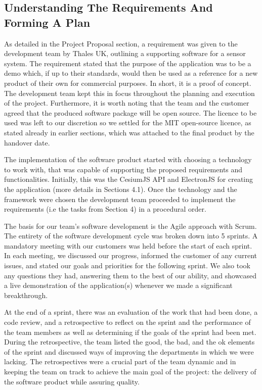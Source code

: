 \documentclass{l3proj}
\begin{document}
\subsection{Understanding The Requirements And Forming A Plan}

As detailed in the Project Proposal section, a requirement was given to the development team by Thales UK, outlining a supporting software for a sensor system. The requirement stated that the purpose of the application was to be a demo which, if up to their standards, would then be used as a reference for a new product of their own for commercial purposes. In short, it is a proof of concept. The development team kept this in focus throughout the planning and execution of the project. Furthermore, it is worth noting that the team and the customer agreed that the produced software package will be open source. The licence to be used was left to our discretion so we settled for the MIT open-source licence, as stated already in earlier sections, which was attached to the final product by the handover date. 
  
The implementation of the software product started with choosing a technology to work with, that was capable of supporting the proposed requirements and functionalities. Initially, this was the CesiumJS API and ElectronJS for creating the application (more details in Sections 4.1). Once the technology and the framework were chosen the development team proceeded to implement the requirements (i.e the tasks from Section 4) in a procedural order.

The basis for our team’s software development is the Agile\cite{agile} approach with Scrum\cite{scrum}. The entirety of the software development cycle was broken down into 5 sprints. A mandatory meeting with our customers was held before the start of each sprint. In each meeting, we discussed our progress, informed the customer of any current issues, and stated our goals and priorities for the following sprint. We also took any questions they had, answering them to the best of our ability, and showcased a live demonstration of the application(s) whenever we made a significant breakthrough.
 
At the end of a sprint, there was an evaluation of the work that had been done, a code review\cite{coder}, and a retrospective\cite{retro} to reflect on the sprint and the performance of the team members as well as determining if the goals of the sprint had been met. During the retrospective, the team listed the good, the bad, and the ok elements of the sprint and discussed ways of improving the departments in which we were lacking. The retrospectives were a crucial part of the team dynamic and in keeping the team on track to achieve the main goal of the project: the delivery of the software product while assuring quality.
\end{document}
